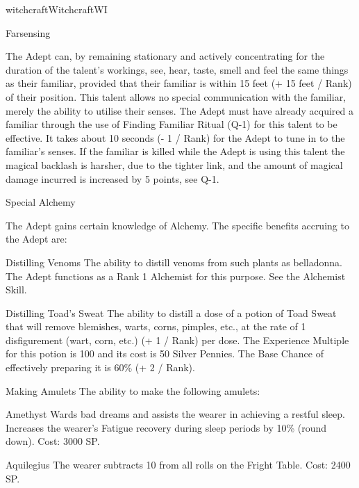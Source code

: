 \begin{college}[1.1]{witchcraft}{Witchcraft}{WI}
\begin{talent}[T-1]{Farsensing}
\begin{effects}
The Adept can, by remaining stationary and actively concentrating for
the duration of the talent's workings, see, hear, taste, smell and
feel the same things as their familiar, provided that their familiar
is within 15 feet (+ 15 feet / Rank) of their position.  This talent
allows no special communication with the familiar, merely the ability
to utilise their senses.  The Adept must have already acquired a
familiar through the use of Finding Familiar Ritual (Q-1) for this
talent to be effective.  It takes about 10 seconds (- 1 / Rank) for
the Adept to tune in to the familiar's senses.  If the familiar is
killed while the Adept is using this talent the magical backlash is
harsher, due to the tighter link, and the amount of magical damage
incurred is increased by 5 points, see Q-1.
\end{effects}
\end{talent}

\begin{talent}[T-2]{Special Alchemy}
\begin{effects}
The Adept gains certain knowledge of Alchemy.  The specific benefits
accruing to the Adept are:

\begin{Description}
\item[Distilling Venoms]
The ability to distill venoms from such plants as belladonna.  The
Adept functions as a Rank 1 Alchemist for this purpose.  See the
Alchemist Skill.

\item[Distilling Toad's Sweat]
The ability to distill a dose of a potion of Toad Sweat that will
remove blemishes, warts, corns, pimples, etc., at the rate of 1
disfigurement (wart, corn, etc.) (+ 1 / Rank) per dose.  The
Experience Multiple for this potion is 100 and its cost is 50 Silver
Pennies.  The Base Chance of effectively preparing it is 60\% (+ 2 /
Rank).

\item[Making Amulets]
The ability to make the following amulets:

\item[Amethyst]
Wards bad dreams and assists the wearer in achieving a restful sleep.
Increases the wearer's Fatigue recovery during sleep periods by 10\%
(round down).  Cost: 3000 SP.

\item[Aquilegius]
The wearer subtracts 10 from all rolls on the Fright Table.  Cost:
2400 SP.


\end{Description}
\end{effects}
\end{talent}
\end{college}

